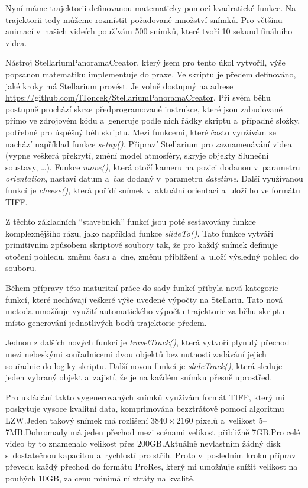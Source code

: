 \documentclass[12pt,a4paper,titlepage]{article}
\begin{document}
Nyní máme trajektorii definovanou matematicky pomocí kvadratické funkce. Na trajektorii tedy můžeme rozmístit požadované množství snímků. Pro většinu animací v~našich videích používám 500 snímků, které tvoří 10 sekund finálního videa.

Nástroj StellariumPanoramaCreator, který jsem pro tento úkol vytvořil, výše popsanou matematiku implementuje do praxe. Ve skriptu je předem definováno, jaké kroky má Stellarium provést. Je volně dostupný na adrese \url{https://github.com/IToncek/StellariumPanoramaCreator}. Při svém běhu postupně prochází skrze předprogramované instrukce, které jsou zabudované přímo ve zdrojovém kódu a~generuje podle nich řádky skriptu a~případné složky, potřebné pro úspěšný běh skriptu. Mezi funkcemi, které často využívám se nachází například funkce \textit{setup()}. Připraví Stellarium pro zaznamenávání videa (vypne veškerá překrytí, změní model atmosféry, skryje objekty Sluneční soustavy, \ldots). Funkce \textit{move()}, která otočí kameru na pozici dodanou v~parametru \textit{orientation}, nastaví datum a~čas dodaný v~parametru \textit{datetime}. Další využívanou funkcí je \textit{cheese()}, která pořídí snímek v~aktuální orientaci a~uloží ho ve formátu TIFF.%

Z těchto základních \enquote{stavebních} funkcí jsou poté sestavovány funkce komplexnějšího rázu, jako například funkce \textit{slideTo()}. Tato funkce vytváří primitivním způsobem skriptové soubory tak, že pro každý snímek definuje otočení pohledu, změnu času a~dne, změnu přiblížení a~uloží výsledný pohled do souboru. %

Během přípravy této maturitní práce do sady funkcí přibyla nová kategorie funkcí, které nechávají veškeré výše uvedené výpočty na Stellariu. Tato nová metoda umožňuje využití automatického výpočtu trajektorie za běhu skriptu místo generování jednotlivých bodů trajektorie předem. 

Jednou z dalších nových funkcí je \textit{travelTrack()}, která vytvoří plynulý přechod mezi nebeskými souřadnicemi dvou objektů bez nutnosti zadávání jejich souřadnic do logiky skriptu. Další novou funkcí je \textit{slideTrack()}, která sleduje jeden vybraný objekt a~zajistí, že je na každém snímku přesně uprostřed. %

Pro ukládání takto vygenerovaných snímků využívám formát TIFF, který mi poskytuje vysoce kvalitní data, komprimována bezztrátově pomocí algoritmu LZW.\@ Jeden takový snímek má rozlišení \(3840\times2160\) pixelů a~velikost 5--7MB.\@ Dohromady má jeden přechod mezi scénami velikost přibližně 7GB.\@ Pro celé video by to znamenalo velikost přes 200GB.\@ Aktuálně nevlastním žádný disk s~dostatečnou kapacitou a~rychlostí pro střih. Proto v~posledním kroku příprav převedu každý přechod do formátu ProRes, který mi umožňuje snížit velikost na pouhých 10GB, za cenu minimální ztráty na kvalitě. 
\end{document}

